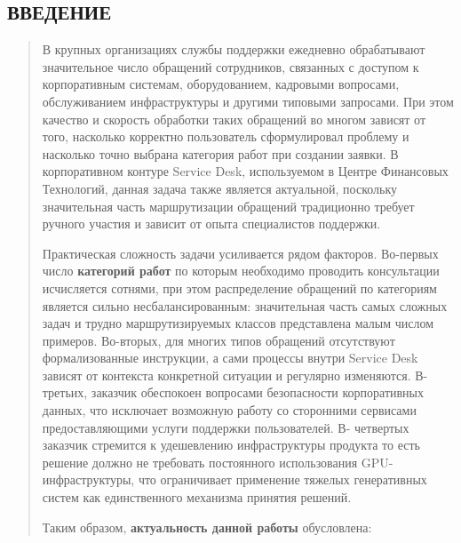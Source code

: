 \hypertarget{section}{%
\subsection*{}\label{section}}

\hypertarget{ux432ux432ux435ux434ux435ux43dux438ux435}{%
\subsection*{ВВЕДЕНИЕ}\label{ux432ux432ux435ux434ux435ux43dux438ux435}}

\begin{quote}
В крупных организациях службы поддержки ежедневно обрабатывают
значительное число обращений сотрудников, связанных с доступом к
корпоративным системам, оборудованием, кадровыми вопросами,
обслуживанием инфраструктуры и другими типовыми запросами. При этом
качество и скорость обработки таких обращений во многом зависят от того,
насколько корректно пользователь сформулировал проблему и насколько
точно выбрана категория работ при создании заявки. В корпоративном
контуре Service Desk, используемом в Центре Финансовых Технологий,
данная задача также является актуальной, поскольку значительная часть
маршрутизации обращений традиционно требует ручного участия и зависит от
опыта специалистов поддержки.

Практическая сложность задачи усиливается рядом факторов. Во-первых
число \textbf{категорий работ} по которым необходимо проводить
консультации исчисляется сотнями, при этом распределение обращений по
категориям является сильно несбалансированным: значительная часть самых
сложных задач и трудно маршрутизируемых классов представлена малым
числом примеров. Во-вторых, для многих типов обращений отсутствуют
формализованные инструкции, а сами процессы внутри Service Desk зависят
от контекста конкретной ситуации и регулярно изменяются. В-третьих,
заказчик обеспокоен вопросами безопасности корпоративных данных, что
исключает возможную работу со сторонними сервисами предоставляющими
услуги поддержки пользователей. В- четвертых заказчик стремится к
удешевлению инфраструктуры продукта то есть решение должно не требовать
постоянного использования GPU-инфраструктуры, что ограничивает
применение тяжелых генеративных систем как единственного механизма
принятия решений.

Таким образом, \textbf{актуальность данной работы} обусловлена:
\end{quote}

